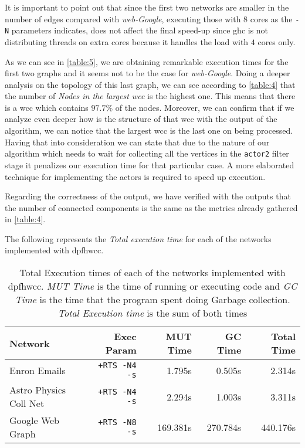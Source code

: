 It is important to point out that since the first two networks are smaller in the number of edges compared with \emph{web-Google}, executing those with $8$ cores as the \texttt{-N} parameters indicates, does not affect the final speed-up since \acrshort{ghc} is not distributing threads on extra cores because it handles the load with $4$ cores only.

As we can see in \autoref{table:5}, we are obtaining remarkable execution times for the first two graphs and it seems not to be the case for \textit{web-Google}. Doing a deeper analysis on the topology of this last graph, we can see according to \autoref{table:4} that the number of \textit{Nodes in the largest \acrshort{wcc}} is the highest one. This means that there is a \acrshort{wcc} which contains $97.7\%$ of the nodes. Moreover, we can confirm that if we analyze even deeper how is the structure of that \acrshort{wcc} with the output of the algorithm, we can notice that the largest \acrshort{wcc} is the last one on being processed. Having that into consideration we can state that due to the nature of our algorithm which needs to wait for collecting all the vertices in the \texttt{actor2} filter stage 
it penalizes our execution time for that particular case. A more elaborated technique for implementing the actors is required to speed up execution. 

Regarding the correctness of the output, we have verified with the outputs that the number of connected components is the same as the metrics already gathered in \autoref{table:4}.

The following represents the \emph{Total execution time} for each of the networks implemented with \acrshort{dpfhwcc}.
 
\begin{table}[H]
  \centering
  \begin{tabular}{|l|r|r|r|r|}
   \hline
   \textbf{Network} & \textbf{Exec Param} & \textbf{MUT Time} & \textbf{GC Time} & \textbf{Total Time}\\
   \hline
   Enron Emails & \texttt{+RTS -N4 -s} & 1.795s & 0.505s & 2.314s \\
   \hline
   Astro Physics Coll Net & \texttt{+RTS -N4 -s} & 2.294s & 1.003s & 3.311s \\
   \hline
   Google Web Graph & \texttt{+RTS -N8 -s} & 169.381s & 270.784s & 440.176s \\
   \hline
  \end{tabular}
 \caption{Total Execution times of each of the networks implemented with \acrshort{dpfhwcc}. \textit{MUT Time} is the time of running or executing code and \textit{GC Time} is the time that the program spent doing Garbage collection. \textit{Total Execution time} is the sum of both times}
 \label{table:new:wcc:dpfh:5}
 \end{table}


